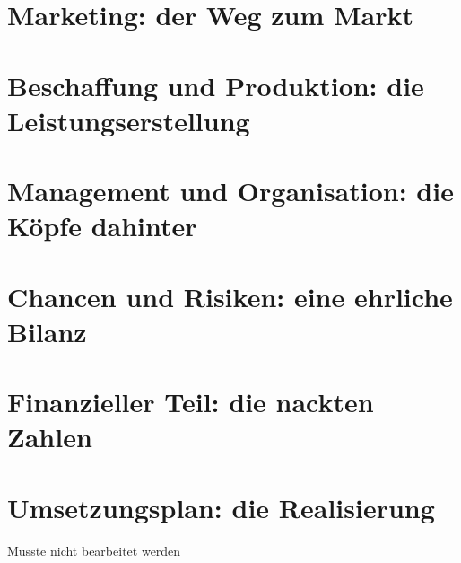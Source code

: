 \section{Marketing: der Weg zum Markt}

\section{Beschaffung und Produktion: die Leistungserstellung}

\section{Management und Organisation: die Köpfe dahinter}

\section{Chancen und Risiken: eine ehrliche Bilanz}

\section{Finanzieller Teil: die nackten Zahlen}


\section{Umsetzungsplan: die Realisierung}
Musste nicht bearbeitet werden

